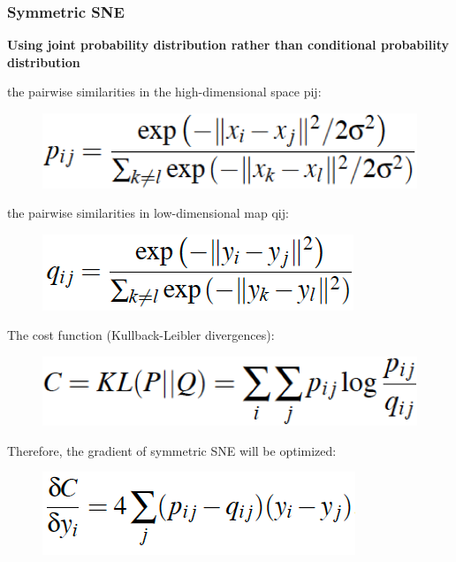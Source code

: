 \documentclass{beamer}
\begin{document}
% 
% 
% 
% 
% 
% 
\begin{frame}
  \frametitle{Symmetric SNE}

    \textbf{Using joint probability distribution rather than conditional probability distribution}

    the pairwise similarities in the high-dimensional space pij:
    \begin{figure}
        \centering
        \includegraphics[height=0.1\textheight]{images/equation2.png}
    \end{figure}
    the pairwise similarities in low-dimensional map qij:
    \begin{figure}
        \centering
        \includegraphics[height=0.1\textheight]{images/equation3.png}
    \end{figure}
    The cost function (Kullback-Leibler divergences):
    \begin{figure}
        \centering
        \includegraphics[height=0.1\textheight]{images/equation1.png}
    \end{figure}
    Therefore, the gradient of symmetric SNE will be optimized:
    \begin{figure}
        \centering
        \includegraphics[height=0.1\textheight]{images/equation4.png}
    \end{figure}
\end{frame}
\end{document}
